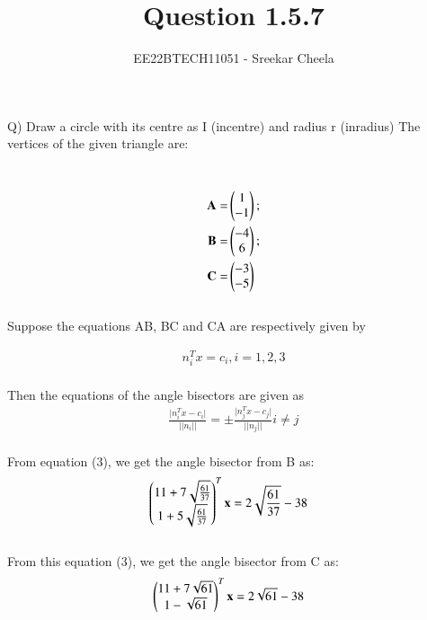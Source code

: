\documentclass[journal,12pt,twocolumn]{IEEEtran}
\theoremstyle{remark}
\begin{document}
%




\vspace{3cm}

\title{
Question 1.5.7
}
\author{ EE22BTECH11051 - Sreekar Cheela 
}	

\maketitle

\newpage


\begin{flushleft}
	\large Q) Draw a circle with its centre as I (incentre) and radius r (inradius)
	\bigskip
	\large The vertices of the given triangle are:
\end{flushleft}
\\
\begin{align}
	\mathbf {A}= &\begin{pmatrix}1\\-1\end{pmatrix};\\ \mathbf {B}= &\begin{pmatrix}-4\\6\end{pmatrix};\\ \mathbf {C}= &\begin{pmatrix}-3\\-5\end{pmatrix}	
\end{align}
\\
Suppose the equations AB, BC and CA are respectively given by

 \large \begin{align}
    n_{i}^{T} x = c_i , i = 1,2,3
    \end{align}
\\
Then the equations of the angle bisectors are given as 
\\
\begin{align}
     \frac{\lvert n_{i}^{T} x - c_i  \rvert}{\lvert \lvert n_{i} \rvert \rvert} = \pm 
	 \frac{\lvert n_{j}^{T} x - c_j  \rvert}{\lvert \lvert n_{j} \rvert \rvert}
	 i \neq j
\end{align}
 \\
\bigskip 
 From equation (3), we get the angle bisector from B as:
\begin{align}
	&\begin{pmatrix}
        11 + 7\sqrt{\frac{61}{37}} \\
        1 + 5\sqrt{\frac{61}{37}}			
			\end{pmatrix}^{T}
			\mathbf {x} = 2\sqrt{\frac{61}{37}}-38
\end{align}   
\\
 From this equation (3), we get the angle bisector from C as:
\\
\begin{align}
	&\begin{pmatrix}
		11 + 7\sqrt{61} \\
    	1 - \sqrt{61}
		   \end{pmatrix}^{T}
		   \mathbf {x} = 2\sqrt{61}-38
\end{align}
\end{document}
